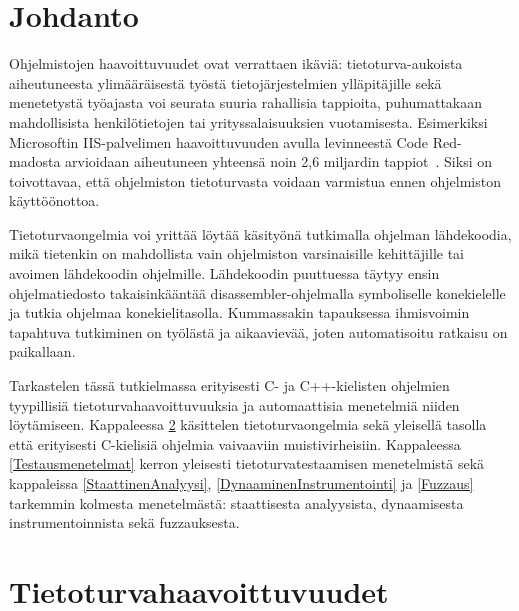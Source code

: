 \section{Johdanto}

Ohjelmistojen haavoittuvuudet ovat verrattaen ikäviä:
tietoturva-aukoista aiheutuneesta ylimääräisestä työstä tietojärjestelmien ylläpitäjille
sekä menetetystä työajasta voi seurata suuria rahallisia tappioita,
puhumattakaan mahdollisista henkilötietojen tai yrityssalaisuuksien vuotamisesta.
Esimerkiksi Microsoftin IIS-palvelimen haavoittuvuuden avulla levinneestä Code Red-madosta
arvioidaan aiheutuneen yhteensä noin 2,6 miljardin tappiot~\cite{CodeRed}.
Siksi on toivottavaa, että ohjelmiston tietoturvasta voidaan varmistua ennen ohjelmiston käyttöönottoa.

Tietoturvaongelmia voi yrittää löytää käsityönä tutkimalla ohjelman lähdekoodia,
mikä tietenkin on mahdollista vain ohjelmiston varsinaisille kehittäjille
tai avoimen lähdekoodin ohjelmille.
Lähdekoodin puuttuessa täytyy ensin ohjelmatiedosto takaisinkääntää
disassembler-ohjelmalla symboliselle konekielelle
ja tutkia ohjelmaa konekielitasolla.
Kummassakin tapauksessa ihmisvoimin tapahtuva tutkiminen on työlästä ja aikaavievää, joten automatisoitu ratkaisu on paikallaan.

Tarkastelen tässä tutkielmassa erityisesti C- ja C++-kielisten ohjelmien tyypillisiä tietoturvahaavoittuvuuksia
ja automaattisia menetelmiä niiden löytämiseen.
Kappaleessa \ref{YleinenTietoturva} käsittelen tietoturvaongelmia sekä yleisellä tasolla
että erityisesti C-kielisiä ohjelmia vaivaaviin muistivirheisiin.
Kappaleessa \ref{Testausmenetelmat} kerron yleisesti tietoturvatestaamisen menetelmistä
sekä kappaleissa \ref{StaattinenAnalyysi}, \ref{DynaaminenInstrumentointi} ja \ref{Fuzzaus}
tarkemmin kolmesta menetelmästä: staattisesta analyysista, dynaamisesta instrumentoinnista sekä fuzzauksesta.
\fixme[kappalejärjestys?]

\section{Tietoturvahaavoittuvuudet}
\label{YleinenTietoturva}
